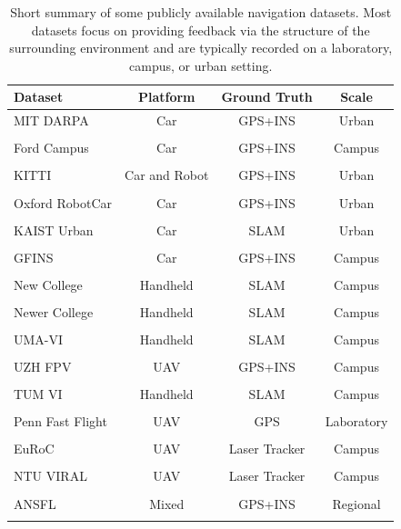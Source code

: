 \documentclass[Afour,sageh,times]{sagej}
\begin{document}
\begin{table}
  \caption{Short summary of some publicly available navigation datasets. Most datasets focus on providing feedback via the structure of the surrounding environment and are typically recorded on a laboratory, campus, or urban setting.}
  \label{tab:dataset_summary}
  \centering
  \begin{tabular}{|l|c|c|c|}
    \hline
    \textbf{Dataset} & \textbf{Platform} & \textbf{Ground Truth} & \textbf{Scale} \\
    \hline
    MIT DARPA & Car & GPS+INS & Urban \\
    \cite{mit-darpa} & & & \\
    \hline
    Ford Campus  & Car & GPS+INS & Campus \\
    \cite{ford-campus} & & & \\
    \hline
    KITTI  & Car and Robot & GPS+INS & Urban \\
    \cite{kitti} & & & \\
    \hline
    Oxford RobotCar  & Car & GPS+INS & Urban \\
    \cite{oxford-robotcar} & & & \\
    \hline
    KAIST Urban & Car & SLAM & Urban \\
    \cite{kaist-urban} & &  & \\
    \hline
    GFINS & Car & GPS+INS & Campus \\
    \cite{yampolsky2024multiple} & & & \\
    \hline
    New College & Handheld & SLAM & Campus \\
    \cite{new-college} & & & \\
    \hline
    Newer College & Handheld & SLAM & Campus \\
    \cite{newer-college} & & & \\
    \hline
    UMA-VI & Handheld & SLAM & Campus \\
    \cite{uma-vi} & & & \\
    \hline
    UZH FPV & UAV & GPS+INS & Campus \\
    \cite{uzh-fpv} & & & \\
    \hline
    TUM VI & Handheld & SLAM & Campus \\
    \cite{tum-vi} & & & \\
    \hline
    Penn Fast Flight & UAV & GPS & Laboratory \\
    \cite{upenn-fast-flight} & & & \\
    \hline
    EuRoC & UAV & Laser Tracker & Campus \\
    \cite{burri2016euroc} & & & \\
    \hline
    NTU VIRAL & UAV & Laser Tracker & Campus \\
    \cite{nguyen2022ntu} & & & \\
    \hline
    ANSFL & Mixed & GPS+INS & Regional \\ %
    \cite{ansfl} & & & \\
    \hline
  \end{tabular}
\end{table}
\end{document}

